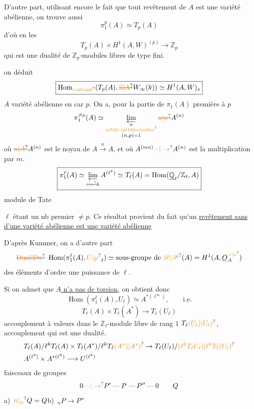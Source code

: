 D'autre part, utilisant encore le fait que tout revêtement de $A$ est une variété abélienne, on trouve aussi
\[
\boxed{\pi_1^p(A)\simeq T_p(A)}
\]
d'où en les 
\[
\boxed{T_p(A)\times H^1(A,W)^{(p)}\longrightarrow\mathbb Z_p}
\]
qui est une dualité de $\mathbb Z_p$-modules libres de type fini.

  on déduit
\[
\boxed{\operatorname{Hom}_{\unsure{\mathrm{cont}|\mathrm{ant}}}(T_p(A),\deleted{\unsure{\mathbb Z|\Lambda}}W_{\infty}(k))\simeq H^1(A,W)_s}
\]
$A$ variété abélienne en car $p$. On a, pour la partie de $\pi_1(A)$ première à $p$
\[
\pi_1^{\ne p}(A)\simeq\varprojlim_{\substack{n\\\text{\unsure{arbitr.|arbitre|entier}}\\(n,p)=1}}
\deleted{\unsure{a|n}}A^{(n)}
\]
où $\deleted{\unsure{n|A}}A^{(n)}$ est le noyau de $A\xrightarrow{n}A$, et où $A^{(mn)}\unsure{-|\to} A^{(n)}$ est la multiplication par $m$.
\[
\boxed{\pi_1^\ell(A)\simeq\varprojlim_{\deleted{\unsure{\ell|n}}k}A^{(\ell^k)}
\simeq T_\ell(A)=\operatorname{Hom}(\underline{\mathbb Q}_\ell/\mathbb Z_\ell,A)}
\]
module de Tate

$\ell$ étant un nb premier $\ne p$. Ce résultat provient du fait qu'un \uline{revêtement sans  d'une variété abélienne est une variété abélienne}

D'après Kummer, on a d'autre part
\[
\deleted{\unsure{\mathrm{Dual}|\mathrm{Du}}}\ \operatorname{Hom}(\pi_1^\ell(A),\unsure{U|\mu}_\ell)\simeq
\text{sous-groupe de }\unsure{\mathscr D|\mathscr P}(A)=H^1(A,\underline O_A^{\unsure{\times|*}})
\]
des éléments d'ordre une puissance de $\ell$.

Si on admet que \uline{$A$ n'a pas de torsion}, on obtient donc
\[
\operatorname{Hom}(\pi_1^\ell(A),U_\ell)\simeq A^{*(\ell^\infty)},\qquad\text{i.e.}
\]
\[
\boxed{T_\ell(A)\times T_\ell(A^*)\longrightarrow T_\ell(U_\ell)}
\]
accouplement à valeurs dans le $\mathbb Z_\ell$-module libre de rang $1$ $T_\ell\unsure{(U_\ell)|U_\ell)}$,  accouplement qui est une dualité.
\[
\begin{aligned}
&T_\ell(A)/\ell^kT_\ell(A)\times T_\ell(A^*)/\ell^kT_\ell\unsure{(A^*)|A^*)}
\to T_\ell(U_\ell)/\unsure{(\ell^kT_\ell U_\ell)|\ell^kT_\ell(U_\ell)}\\
&A^{(\ell^k]}\times A^{*(\ell^k)}\longrightarrow U^{(\ell^k)}
\end{aligned}
\]
  faisceaux de groupes
\[
0\unsure{\text{---}|\to}P'\mathbin{\text{---}}P\mathbin{\text{---}}P''\mathbin{\text{---}}0\qquad Q
\]
 a) $\,\unsure{n|{}_n}Q=Q$\quad b) $\,{}_nP\to P''$ 

